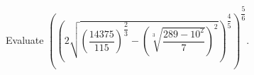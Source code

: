 Evaluate $\left(\left(2\sqrt{\left(\dfrac{14375}{115}\right)^{\dfrac23}-\left(\sqrt[3]{\dfrac{289-10^2}7}\right)^2}\right)^{\dfrac45}\right)^{\dfrac56}$.
